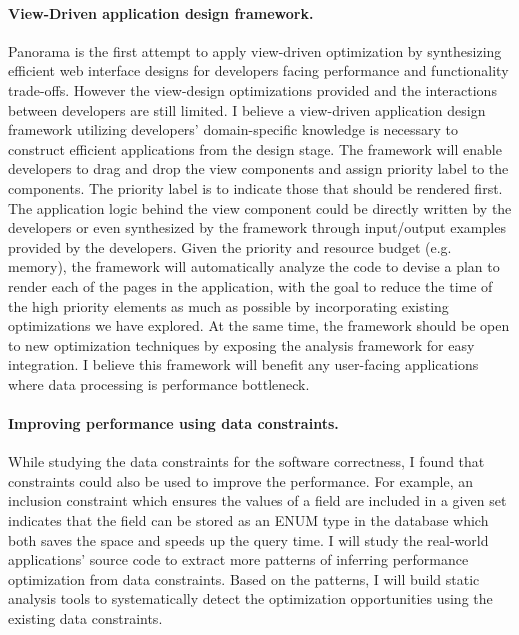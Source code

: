 \paragraph{\textbf{View-Driven application design framework.}}
Panorama is the first attempt to apply view-driven optimization by synthesizing efficient web interface designs for developers facing performance and functionality trade-offs. However the view-design optimizations provided and the interactions between developers are still limited. I believe a view-driven application design framework utilizing developers' domain-specific knowledge is necessary to construct efficient applications from the design stage.  The framework will enable developers to drag and drop the view components and assign priority label to the components. The priority label is to indicate those that should be rendered first. The application logic behind the view component could be directly written by the developers or even synthesized by the framework through input/output examples provided by the developers. Given the priority and resource budget (e.g. memory), the framework will automatically analyze the code to devise a plan to render each of the pages in the application, with the goal to reduce the time of the high priority elements as much as possible by incorporating existing optimizations we have explored. At the same time, the framework should be open to new optimization techniques by exposing the analysis framework for easy integration. I believe this framework will benefit any user-facing applications where data processing is performance bottleneck. %


\paragraph{\textbf{Improving performance using data constraints.}}
While studying the data constraints for the software correctness, I  found that constraints could also be used to improve the performance. For example, an inclusion constraint which ensures the values of a field are included in a given set indicates that the field can be stored as an ENUM type in the database which both saves the space and speeds up the query time. I will study the real-world applications' source code to extract more patterns of inferring performance optimization from data constraints. Based on the patterns, I will build static analysis tools to systematically detect the optimization opportunities using the existing data constraints. 




